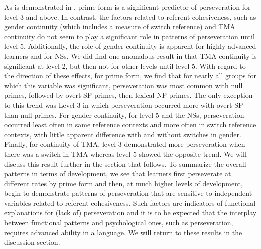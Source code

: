 \documentclass[output=paper]{langscibook}
\begin{document}
As is demonstrated in , prime form is a significant predictor of perseveration for level 3 and above. In contrast, the factors related to referent cohesiveness, such as gender continuity (which includes a measure of switch reference) and TMA continuity do not seem to play a significant role in patterns of perseveration until level 5. Additionally, the role of gender continuity is apparent for highly advanced learners and for NSs. We did find one anomalous result in that TMA continuity is significant at level 2, but then not for other levels until level 5. With regard to the direction of these effects, for prime form, we find that for nearly all groups for which this variable was significant, perseveration was most common with null primes, followed by overt SP primes, then lexical NP primes. The only exception to this trend was Level 3 in which perseveration occurred more with overt SP than null primes. For gender continuity, for level 5 and the NSs, perseveration occurred least often in same reference contexts and more often in switch reference contexts, with little apparent difference with and without switches in gender. Finally, for continuity of TMA, level 3 demonstrated more perseveration when there was a switch in TMA whereas level 5 showed the opposite trend.  We will discuss this result further in the section that follows. To summarize the overall patterns in terms of development, we see that learners first perseverate at different rates by prime form and then, at much higher levels of development, begin to demonstrate patterns of perseveration that are sensitive to independent variables related to referent cohesiveness. Such factors are indicators of functional explanations for (lack of) perseveration and it is to be expected that the interplay between functional patterns and psychological ones, such as perseveration, requires advanced ability in a language. We will return to these results in the discussion section.
\end{document}
